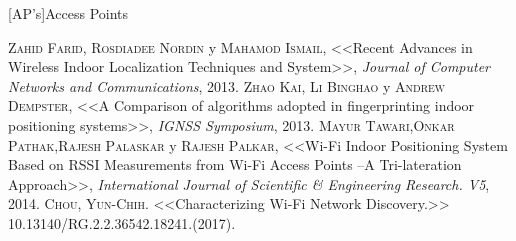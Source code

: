 \documentclass[letterpaper,oneside,12pt]{book}
\begin{document}
[AP's]{Access Points}


\begin{acronym}

\end{acronym}

%
%

\newpage
\pagestyle{fancy} 	%


 
\newpage



%

%


\newpage
%


 \newpage
 
% 
\begin{thebibliography}{X}

 \textsc{Zahid Farid, Rosdiadee Nordin} y \textsc{Mahamod Ismail}, <<Recent Advances in Wireless Indoor Localization Techniques
and System>>, \textit{Journal of Computer Networks and Communications}, 2013.
 \textsc{Zhao Kai, Li Binghao} y \textsc{Andrew Dempster}, <<A Comparison of algorithms adopted in fingerprinting indoor positioning systems>>, \textit{IGNSS Symposium}, 2013.
 \textsc{Mayur Tawari},\textsc{Onkar Pathak},\textsc{Rajesh Palaskar} y \textsc{Rajesh Palkar}, <<Wi-Fi Indoor Positioning System
Based on RSSI Measurements from Wi-Fi Access Points –A Tri-lateration Approach>>, \textit{International Journal of Scientific \& Engineering Research. V5}, 2014.
 \textsc{Chou, Yun-Chih.} <<Characterizing Wi-Fi Network Discovery.>> 10.13140/RG.2.2.36542.18241.(2017).
\end{thebibliography}
\end{document}
